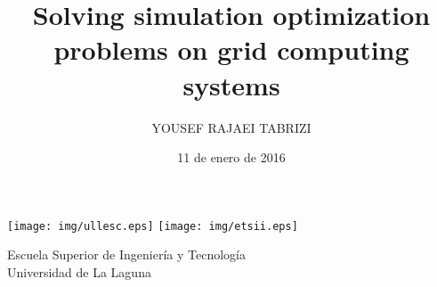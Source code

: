 \documentclass{beamer}
\title[Peresentacion de la asignatura CA ]{Solving simulation optimization problems on grid
computing systems}
\author[Autor]{YOUSEF RAJAEI TABRIZI}
\institute[ULL]{Universidad de La Laguna}
\date{11 de enero de 2016}
\begin{document}
  
\begin{frame}

  \texttt{[image: img/ullesc.eps]}
  \hspace*{7.5cm}
  \texttt{[image: img/etsii.eps]}
  \titlepage

  \begin{scriptsize}
    \begin{center}
     Escuela Superior de Ingeniería y Tecnología \\
     Universidad de La Laguna
    \end{center}
  \end{scriptsize}

\end{frame}




\end{document}
